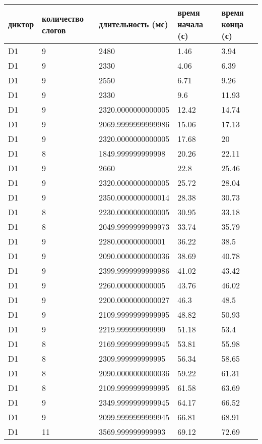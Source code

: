 \begin{longtable}{|l|l|l|l|l|}
\hline
диктор & количество слогов & длительность (мс) & время начала (с) & время конца (с)\\
\hline \endhead
D1 & 9 & 2480 & 1.46 & 3.94 \\ \hline
D1 & 9 & 2330 & 4.06 & 6.39 \\ \hline
D1 & 9 & 2550 & 6.71 & 9.26 \\ \hline
D1 & 9 & 2330 & 9.6 & 11.93 \\ \hline
D1 & 9 & 2320.0000000000005 & 12.42 & 14.74 \\ \hline
D1 & 9 & 2069.9999999999986 & 15.06 & 17.13 \\ \hline
D1 & 9 & 2320.0000000000005 & 17.68 & 20 \\ \hline
D1 & 8 & 1849.999999999998 & 20.26 & 22.11 \\ \hline
D1 & 9 & 2660 & 22.8 & 25.46 \\ \hline
D1 & 9 & 2320.0000000000005 & 25.72 & 28.04 \\ \hline
D1 & 9 & 2350.0000000000014 & 28.38 & 30.73 \\ \hline
D1 & 8 & 2230.0000000000005 & 30.95 & 33.18 \\ \hline
D1 & 8 & 2049.9999999999973 & 33.74 & 35.79 \\ \hline
D1 & 9 & 2280.000000000001 & 36.22 & 38.5 \\ \hline
D1 & 9 & 2090.0000000000036 & 38.69 & 40.78 \\ \hline
D1 & 9 & 2399.9999999999986 & 41.02 & 43.42 \\ \hline
D1 & 9 & 2260.000000000005 & 43.76 & 46.02 \\ \hline
D1 & 9 & 2200.0000000000027 & 46.3 & 48.5 \\ \hline
D1 & 9 & 2109.9999999999995 & 48.82 & 50.93 \\ \hline
D1 & 9 & 2219.999999999999 & 51.18 & 53.4 \\ \hline
D1 & 8 & 2169.9999999999945 & 53.81 & 55.98 \\ \hline
D1 & 8 & 2309.999999999995 & 56.34 & 58.65 \\ \hline
D1 & 8 & 2090.0000000000036 & 59.22 & 61.31 \\ \hline
D1 & 8 & 2109.9999999999995 & 61.58 & 63.69 \\ \hline
D1 & 9 & 2349.9999999999945 & 64.17 & 66.52 \\ \hline
D1 & 9 & 2099.9999999999945 & 66.81 & 68.91 \\ \hline
D1 & 11 & 3569.999999999993 & 69.12 & 72.69 \\ \hline

\end{longtable}
